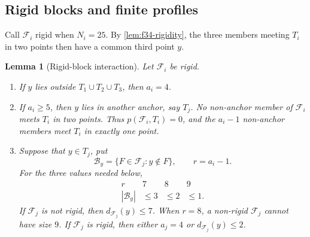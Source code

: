 \documentclass[11pt]{article}
\numberwithin{equation}{section}
\newtheorem{lemma}[lemma]{Lemma}
\theoremstyle{definition}
\theoremstyle{remark}
\newcommand{\F}{\mathcal F}
\newcommand{\B}{\mathcal B}
\begin{document}
\subsection{Rigid blocks and finite profiles}

Call $\F_i$ rigid when $N_i=25$. By \cref{lem:f34-rigidity}, the three
members meeting $T_i$ in two points then have a common third point $y$.

\begin{lemma}[Rigid-block interaction]
\label{lem:f34-interaction}
Let $\F_i$ be rigid.
\begin{enumerate}[label=\textup{(\roman*)}]
\item If $y$ lies outside $T_1\cup T_2\cup T_3$, then $a_i=4$.
\item If $a_i\ge5$, then $y$ lies in another anchor, say $T_j$. No
      non-anchor member of $\F_i$ meets $T_i$ in two points. Thus
      $p(\F_i,T_i)=0$, and the $a_i-1$ non-anchor members meet $T_i$ in
      exactly one point.
\item Suppose that $y\in T_j$, put
\[
 \B_y=\{F\in\F_j:y\notin F\},
 \qquad r=a_i-1.
\]
For the three values needed below,
\[
\begin{array}{c|rrr}
r&7&8&9\\ \hline
|\B_y|&\le3&\le2&\le1.
\end{array}
\]
If $\F_j$ is not rigid, then $d_{\F_j}(y)\le7$. When $r=8$, a non-rigid
$\F_j$ cannot have size $9$. If $\F_j$ is rigid, then either $a_j=4$ or
$d_{\F_j}(y)\le2$.
\end{enumerate}
\end{lemma}
\end{document}
